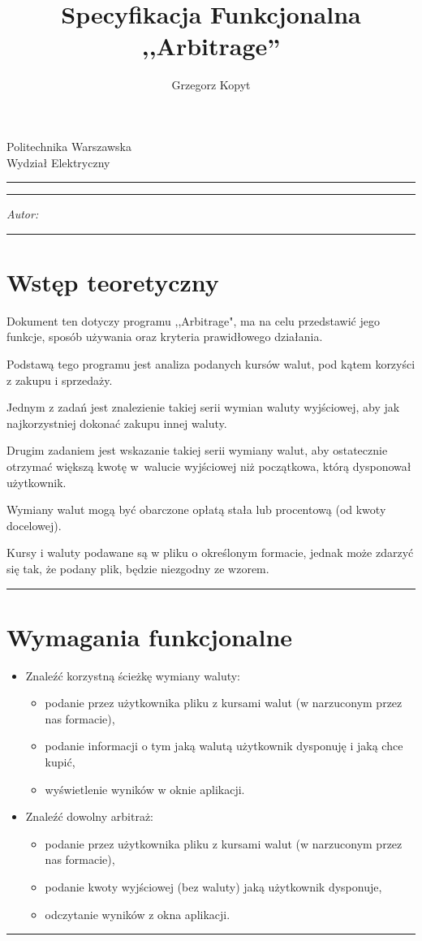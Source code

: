 \documentclass[a4paper,11pt]{article}
\author{Grzegorz Kopyt}
\title{Specyfikacja Funkcjonalna \\
,,Arbitrage''}
\makeatletter
\newcommand{\linia}{\rule{\linewidth}{0.4mm}}
\renewcommand{\maketitle}{\begin{titlepage}
    \vspace*{2cm}
    \begin{center}\LARGE
    Politechnika Warszawska\\
    Wydział Elektryczny\\
    \end{center}
    \vspace{5cm}
    \noindent\linia
    \begin{center}
      \LARGE \textsc{\@title}
         \end{center}
     \linia
    \vspace{0.5cm}
    \begin{flushright}
    \begin{minipage}{5cm}
    \textit{Autor:}\\
    \normalsize \textsc{\@author} \par
    \end{minipage}
    \vspace{5cm}
     \end{flushright}
    \vspace*{\stretch{6}}
    \begin{center}
    \@date
    \end{center}
  \end{titlepage}
}
\makeatother
\begin{document}
\maketitle

\tableofcontents
\vspace{1cm}
\noindent\linia
\section{Wstęp teoretyczny}

Dokument ten dotyczy programu ,,Arbitrage", ma na celu przedstawić jego funkcje, sposób używania oraz kryteria prawidłowego działania.

Podstawą tego programu jest analiza podanych kursów walut, pod kątem korzyści z zakupu i sprzedaży.

Jednym z zadań jest znalezienie takiej serii wymian waluty wyjściowej, aby jak najkorzystniej dokonać zakupu innej waluty.

Drugim zadaniem jest wskazanie takiej serii wymiany walut, aby ostatecznie otrzymać większą kwotę w~walucie wyjściowej niż początkowa, którą dysponował użytkownik.

Wymiany walut mogą być obarczone opłatą stała lub procentową (od kwoty docelowej).

Kursy i waluty podawane są w pliku o określonym formacie, jednak może zdarzyć się tak, że podany plik, będzie niezgodny ze wzorem.

\noindent\linia
\section{Wymagania funkcjonalne}
\begin{itemize}
\item Znaleźć korzystną ścieżkę wymiany waluty:
\begin{itemize}
\item podanie przez użytkownika pliku z kursami walut (w narzuconym przez nas formacie),
\item podanie informacji o tym jaką walutą użytkownik dysponuję  i jaką chce kupić,
\item wyświetlenie wyników w oknie aplikacji.
\end{itemize}
\item Znaleźć dowolny arbitraż:
\begin{itemize}
\item podanie przez użytkownika pliku z kursami walut (w narzuconym przez nas formacie),
\item podanie kwoty wyjściowej (bez waluty) jaką użytkownik dysponuje,
\item odczytanie wyników z okna aplikacji.
\end{itemize}
\end{itemize}
\noindent\linia
\newpage
\end{document}
